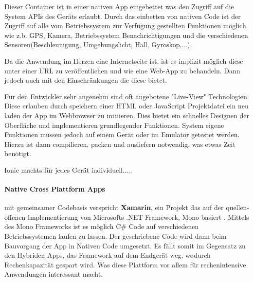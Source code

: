 Dieser Container ist in einer nativen App eingebettet was den Zugriff auf die System APIs des Geräts erlaubt. Durch das einbetten von nativen Code ist der Zugriff auf alle vom Betriebssystem zur Verfügung gestellten Funktionen möglich. wie z.b. GPS, Kamera, Betriebssystem Benachrichtigungen und die verschiedenen Sensoren(Beschleunigung, Umgebungslicht, Hall, Gyroskop,...). 

Da die Anwendung im Herzen eine Internetseite ist, ist es implizit möglich diese unter einer URL zu veröffentlichen und wie eine Web-App zu behandeln. Dann jedoch auch mit den Einschränkungen die diese bietet.

Für den Entwickler sehr angenehm sind oft angebotene "Live-View" Technologien. Diese erlauben durch speichern einer HTML oder JavaScript Projektdatei ein neu laden der App im Webbrowser zu initiieren. Dies bietet ein schnelles Designen der Oberfläche und implementieren grundlegender Funktionen. System eigene Funktionen müssen jedoch auf einem Gerät oder im Emulator getestet werden. Hierzu ist dann compilieren, packen und ausliefern notwendig, was etwas Zeit benötigt.

Ionic machts für jedes Gerät individuell.....


\paragraph{Native Cross Plattform Apps} mit gemeinsamer Codebasis verspricht \textbf{Xamarin}, ein Projekt das auf der quellen-offenen Implementierung von Microsofts .NET Framework, Mono basiert \cite{MONO16}. Mittels des Mono Frameworks ist es möglich C\# Code auf verschiedenen Betriebssystemen laufen zu lassen. Der geschriebene Code wird dann beim Bauvorgang der App in Nativen Code umgesetzt. Es fällt somit im Gegensatz zu den Hybriden Apps, das Framework auf dem Endgerät weg, wodurch Rechenkapazität gespart wird. Was diese Plattform vor allem für rechenintensive Anwendungen interessant macht.

